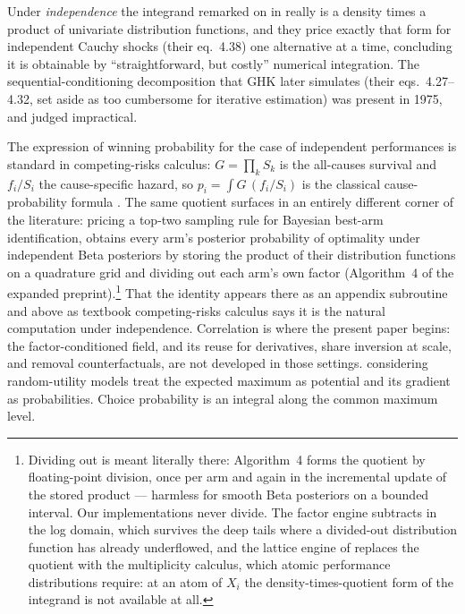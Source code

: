 \documentclass[11pt]{article}
\begin{document}
Under \emph{independence} the integrand remarked on in \citet{domencich1975} really is a density times a product of univariate distribution functions, and they price exactly that form for independent Cauchy shocks (their eq.~4.38) one alternative at a
time, concluding it is obtainable by ``straightforward, but costly''
numerical integration. The sequential-conditioning
decomposition that GHK later simulates (their eqs.~4.27--4.32, set aside
as too cumbersome for iterative estimation) was present in 1975,
and judged impractical.

The expression of winning probability for the case of independent performances is standard in competing-risks
calculus: $G=\prod_k S_k$ is the all-causes survival and $f_i/S_i$ the
cause-specific hazard, so $p_i=\int G\,(f_i/S_i)$ is the classical
cause-probability formula \citep{kalbfleisch2002}. The same quotient
surfaces in an entirely different corner of the literature: pricing a
top-two sampling rule for Bayesian best-arm identification,
\citet{russo2020} obtains every arm's posterior probability of
optimality under independent Beta posteriors by storing the product
of their distribution functions on a quadrature grid and dividing out
each arm's own factor (Algorithm~4 of the expanded
preprint).\footnote{Dividing out is meant literally there:
Algorithm~4 forms the quotient by floating-point division, once per
arm and again in the incremental update of the stored product ---
harmless for smooth Beta posteriors on a bounded interval. Our
implementations never divide. The factor engine subtracts in the log
domain, which survives the deep tails where a divided-out
distribution function has already underflowed, and the lattice engine
of \citet{cotton2021} replaces the quotient with the multiplicity
calculus, which atomic performance distributions require: at an atom
of $X_i$ the density-times-quotient form of the integrand is not
available at all.} That
the identity appears there as an appendix subroutine and above as
textbook competing-risks calculus says it is the natural computation
under independence. Correlation is where the present paper begins:
the factor-conditioned field, and its reuse for derivatives, share
inversion at scale, and removal counterfactuals, are not developed
in those settings.
\citet{fosgerau2013} considering random-utility models treat the expected maximum as potential  and its gradient as probabilities. Choice probability is
an integral along the common maximum level.
\end{document}
